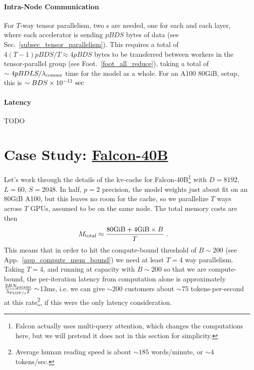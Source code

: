 \documentclass[11pt]{article}
\begin{document}
\paragraph{Intra-Node Communication} For $ T $-way tensor parallelism, two s are
needed, one for each  and each  layer, where each
accelerator is sending $ pBDS  $ bytes of data (see Sec.~\ref{subsec_tensor_parallelism}). This
requires a total of $ 4\left ( T-1 \right ) pBDS/T \approx 4pBDS $ bytes to be transferred between
workers in the tensor-parallel group (see Foot.~\ref{foot_all_reduce}), taking a total of $ \sim  4pBDLS/
	\lambda _{ {\rm comms} }  $ time for the model as a whole. For an A100 80GiB,  setup, this is $ \sim
	BDS \times  10 ^{ -11 } \ {\rm sec} $


\paragraph{Latency} TODO



\section{Case Study: \href{https://huggingface.co/tiiuae/falcon-40b-instruct?_sm_vck=j230jZ2ssDkkPfJTfRt6tjQNTQZJ65N7VDWmj5Ff6f3jZ3mhh2Pq}{Falcon-40B}}

Let's work through the details of the kv-cache for Falcon-40B\footnote{Falcon actually uses
	multi-query attention, which changes the computations here, but we will pretend it does not in this
	section for simplicity.} with $ D=8192 $, $ L=60 $, $ S=2048 $.  In half, $ p=2 $ precision, the model weights just about fit on an
80GiB A100, but this leaves no room for the cache, so we parallelize $ T $ ways across $ T $ GPUs,
assumed to be on the same node. The total memory costs are then
\begin{align}
	M _{ {\rm  total} } & \approx  \frac{ {\rm 80GiB} + {\rm 4GiB}\times B }{ T } \ .
\end{align}
This means that in order to hit the compute-bound threshold of $ B \sim 200 $ (see
App.~\ref{app_compute_mem_bound}) we need at least $ T=4 $ way parallelism.  Taking $ T=4 $, and
running at capacity with $ B \sim 200$ so that we are compute-bound, the per-iteration latency from
computation alone is approximately $ \frac{2BN _{ {\rm params} } }{ \lambda _{ {\rm FLOP/s} } T} \sim
$13ms, i.e. we can give $ \sim $200 customers about $ \sim $75 tokens-per-second at this
rate\footnote{Average human reading speed is about $ \sim 185$ words/minute, or $ \sim 4
	$tokens/sec.}, if this were the only latency consideration.
\end{document}
